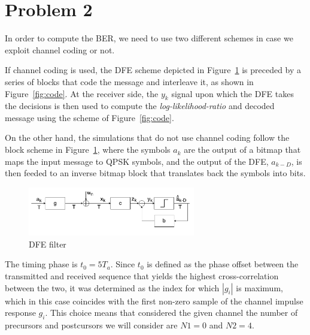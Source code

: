 \documentclass[10pt]{article}
\begin{document}

\section*{Problem 2}
In order to compute the BER, we need to use two different schemes in case we exploit channel coding or not. 

If channel coding is used, the DFE scheme depicted in Figure~\ref{fig:DFE_system} is preceded by a series of blocks that code the message and interleave it, as shown in Figure~\ref{fig:code}. At the receiver side, the $y_k$ signal upon which the DFE takes the decisions is then used to compute the \emph{log-likelihood-ratio} and decoded message using the scheme of Figure~\ref{fig:code}.

On the other hand, the simulations that do not use channel coding follow the block scheme in Figure~\ref{fig:DFE_system}, where the symbols $a_k$ are the output of a bitmap that maps the input message to QPSK symbols, and the output of the DFE, $\hat{a}_{k-D}$, is then feeded to an inverse bitmap block that translates back the symbols into bits.

\begin{figure}[h!]
	\centering
	\includegraphics[width = 0.65\textwidth]{DFE}
	\caption{DFE filter}
	\label{fig:DFE_system}
\end{figure}

The timing phase is $t_0 = 5 T_a$. Since $t_0$ is defined as the phase offset between the transmitted and received sequence that yields the highest cross-correlation between the two, it was determined as the index for which $|g_i|$ is maximum, which in this case coincides with the first non-zero sample of the channel impulse response ${g_i}$. This choice means that considered the given channel the number of precursors and postcursors we will consider are $N1 = 0$ and $N2 = 4$. 
\end{document}
